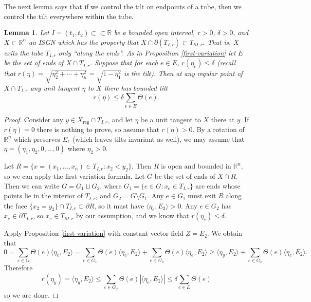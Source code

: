 \documentclass[11pt,reqno,twoside]{amsart}
\newcommand{\reg}{\mathrm{reg}}
\newtheorem{lemma}{Lemma}
\theoremstyle{definition}
\begin{document}
The next lemma says that if we control the tilt on endpoints of a tube, then we control the tilt everywhere within the tube.

\begin{lemma} \label{brussel-sprout-lemma}
    Let $I = (t_1,t_2) \subset\subset \mathbb{R}$ be a bounded open interval, $r > 0$, $\delta > 0$, and $X \subset \mathbb{R}^n$ an ISGN which has the property that $X \cap \partial (T_{I,r}) \subset T_{\partial I, r}$. That is, $X$ exits the tube $T_{I,r}$ only ``along the ends''. As in Proposition \ref{first-variation} let $E$ be the set of ends of $X \cap T_{I,r}$. Suppose that for each $e \in E$, $r(\eta_e) \leq \delta$ (recall that $r(\eta) = \sqrt{\eta_2^2 + \cdots + \eta_n^2} = \sqrt{1 - \eta_1^2}$ is the tilt). Then at any regular point of $X \cap T_{I,r}$ any unit tangent $\eta$ to $X$ there has bounded tilt 
    \[r(\eta) \leq \delta \sum_{e \in E} \Theta(e).\]
\end{lemma}

\begin{proof}
Consider any $y \in X_\reg \cap T_{I,r}$, and let $\eta$ be a unit tangent to $X$ there at $y$. If $r(\eta) = 0$ there is nothing to prove, so assume that $r(\eta) > 0$. By a rotation of $\mathbb{R}^n$ which preserves $E_1$ (which leaves tilts invariant as well), we may assume that $\eta = (\eta_1,\eta_2,0,\ldots,0)$ where $\eta_2 > 0$. 

Let $R = \{x = (x_1,\ldots,x_n) \in T_{I,r}: x_2 < y_2\}$. Then $R$ is open and bounded in $\mathbb{R}^n$, so we can apply the first variation formula. Let $G$ be the set of ends of $X \cap R$. Then we can write $G = G_1 \sqcup G_2$, where $G_1 = \{e \in G: x_e \in T_{I,r}\}$ are ends whose points lie in the interior of $T_{I,r}$, and $G_2 = G \setminus G_1$. 
 Any $e \in G_1$ must exit $R$ along the face $\{x_2=y_2\} \cap T_{I,r} \subset \partial R$, so it must have $\langle \eta_e,E_2\rangle > 0$. Any $e \in G_2$ has $x_e \in \partial T_{I,r}$, so $x_e \in T_{\partial I,r}$ by our assumption, and we know that $r(\eta_e) \leq \delta$.
 
 Apply Proposition \ref{first-variation} with constant vector field $Z = E_2$.
We obtain that
\[0 = \sum_{e \in G} \Theta(e) \langle \eta_e,E_2\rangle = \sum_{e \in G_1} \Theta(e) \langle \eta_e ,E_2\rangle + \sum_{e \in G_2} \Theta(e) \langle \eta_e,E_2\rangle \geq \langle \eta_y,E_2 \rangle + \sum_{e \in G_2} \Theta(e)\langle \eta_e,E_2 \rangle. \]
Therefore
\[r(\eta_y) = \langle \eta_y,E_2\rangle \leq \sum_{e \in G_2} \Theta(e) | \langle \eta_e,E_2\rangle| \leq \delta \sum_{e \in E} \Theta(e) \]
so we are done.
\end{proof}
\end{document}
